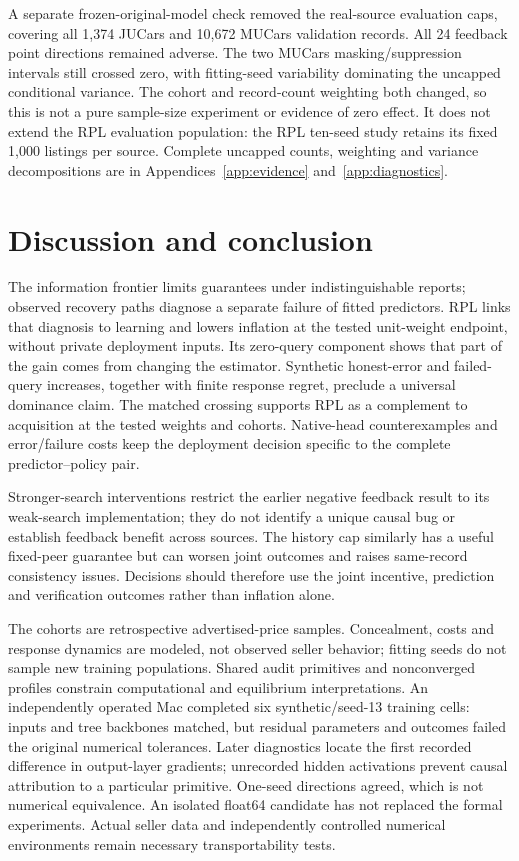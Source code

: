 \documentclass[11pt]{article}
\begin{document}
A separate frozen-original-model check removed the real-source evaluation
caps, covering all 1,374 JUCars and 10,672 MUCars validation records. All 24
feedback point directions remained adverse. The two MUCars masking/suppression
intervals still crossed zero, with fitting-seed variability dominating the
uncapped conditional variance. The cohort and record-count weighting both
changed, so this is not a pure sample-size experiment or evidence of zero
effect. It does not extend the RPL evaluation population: the RPL ten-seed
study retains its fixed 1,000 listings per source. Complete uncapped counts,
weighting and variance decompositions are in
Appendices~\ref{app:evidence} and~\ref{app:diagnostics}.

\clearpage
\section{Discussion and conclusion}\label{sec:discussion}\label{sec:conclusion}
The information frontier limits guarantees under indistinguishable reports;
observed recovery paths diagnose a separate failure of fitted predictors.
RPL links that diagnosis to learning and lowers inflation at the tested
unit-weight endpoint, without private deployment inputs. Its zero-query
component shows that part of the gain comes from changing the estimator.
Synthetic honest-error and failed-query increases, together with finite
response regret, preclude a universal dominance claim. The matched crossing
supports RPL as a complement to acquisition at the tested weights and cohorts.
Native-head counterexamples and error/failure costs keep the deployment
decision specific to the complete predictor--policy pair.

Stronger-search interventions restrict the earlier negative feedback result
to its weak-search implementation; they do not identify a unique causal bug
or establish feedback benefit across sources. The history cap similarly has
a useful fixed-peer guarantee but can worsen joint outcomes and raises
same-record consistency issues. Decisions should therefore use the joint
incentive, prediction and verification outcomes rather than inflation alone.

The cohorts are retrospective advertised-price samples. Concealment, costs
and response dynamics are modeled, not observed seller behavior; fitting
seeds do not sample new training populations. Shared audit primitives and
nonconverged profiles constrain computational and equilibrium interpretations.
An independently operated Mac completed six synthetic/seed-13 training cells:
inputs and tree backbones matched, but residual parameters and outcomes failed
the original numerical tolerances. Later diagnostics locate the first recorded
difference in output-layer gradients; unrecorded hidden activations prevent
causal attribution to a particular primitive. One-seed directions agreed,
which is not numerical equivalence. An isolated float64 candidate has not
replaced the formal experiments. Actual seller data and independently
controlled numerical environments remain necessary transportability tests.
\end{document}
